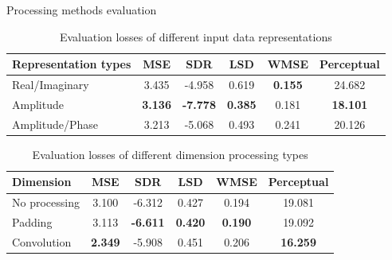 \documentclass{beamer}
\begin{document}
\begin{frame}{Processing methods evaluation}

    \begin{table}
        \centering
        \small
        \caption{Evaluation losses of different input data representations}
        \label{Evaluation losses of the separation types comparison}
        \vspace{-0.2cm}
        \begin{tabular}{l|c|c|c|c|c}
            \hline
            Representation types & MSE & SDR & LSD & WMSE & Perceptual \\
            \hline
            Real/Imaginary & 3.435 & -4.958 & 0.619 & \textbf{0.155} & 24.682 \\
            \hline
            Amplitude & \textbf{3.136} & \textbf{-7.778} & \textbf{0.385} & 0.181 & \textbf{18.101} \\
            \hline
            Amplitude/Phase & 3.213 & -5.068 & 0.493 & 0.241 & 20.126 \\
            \hline
        \end{tabular}
    \end{table}

    \vspace{-0.2\baselineskip}

    \begin{table}
        \centering
        \small
        \caption{Evaluation losses of different dimension processing types}
        \label{Evaluation losses of the dimension processing types comparison}
        \vspace{-0.2cm}
        \begin{tabular}{l|c|c|c|c|c}
            \hline
            Dimension & MSE & SDR & LSD & WMSE & Perceptual \\
            \hline
            No processing & 3.100 & -6.312 & 0.427 & 0.194 & 19.081 \\
            \hline
            Padding & 3.113 & \textbf{-6.611} & \textbf{0.420} & \textbf{0.190} & 19.092 \\
            \hline
            Convolution & \textbf{2.349} & -5.908 & 0.451 & 0.206 & \textbf{16.259} \\
            \hline
        \end{tabular}
    \end{table}

    \vspace{-0.2\baselineskip}


\end{frame}
\end{document}
